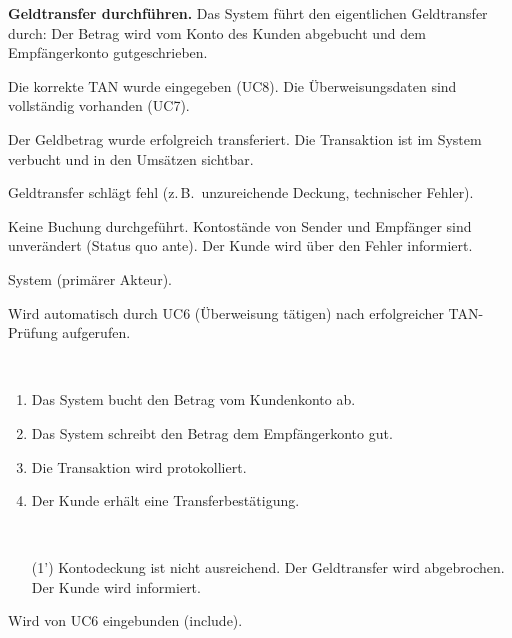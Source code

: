 \documentclass[12pt]{scrartcl}
\newcommand{\umark}[1]{\guillemotleft #1\guillemotright}
\begin{document}
    \begin{description}[leftmargin=4.5cm, style=nextline, font=\normalfont\bfseries]
  \item[Name und Kurzbeschreibung:]
  \textbf{Geldtransfer durchf\"uhren.}
  Das System f\"uhrt den eigentlichen Geldtransfer durch: Der Betrag wird vom
  Konto des Kunden abgebucht und dem Empf\"angerkonto gutgeschrieben.

  \item[Vorbedingung:]
  Die korrekte TAN wurde eingegeben (UC8). Die \"Uberweisungsdaten sind
  vollst\"andig vorhanden (UC7).

  \item[Nachbedingung:]
  Der Geldbetrag wurde erfolgreich transferiert. Die Transaktion ist im
  System verbucht und in den Ums\"atzen sichtbar.

  \item[Fehlersituationen:]
  Geldtransfer schl\"agt fehl (z.\,B.\ unzureichende Deckung, technischer Fehler).

  \item[Systemzustand im Fehlerfall:]
  Keine Buchung durchgef\"uhrt. Kontost\"ande von Sender und Empf\"anger sind
  unver\"andert (Status quo ante). Der Kunde wird \"uber den Fehler informiert.

  \item[Akteure:]
  System (prim\"arer Akteur).

  \item[Trigger:]
  Wird automatisch durch UC6 (\"Uberweisung t\"atigen) nach erfolgreicher
  TAN-Pr\"ufung aufgerufen.

  \item[Standardablauf:]~
  \begin{enumerate}
      \item Das System bucht den Betrag vom Kundenkonto ab.
      \item Das System schreibt den Betrag dem Empf\"angerkonto gut.
      \item Die Transaktion wird protokolliert.
      \item Der Kunde erh\"alt eine Transferbest\"atigung.
  \end{enumerate}

  \item[Alternativablauf:]~
  \begin{itemize}
      \item[(1')] Kontodeckung ist nicht ausreichend. Der Geldtransfer wird
      abgebrochen. Der Kunde wird informiert.
  \end{itemize}

  \item[Beziehung:]
  Wird von UC6 eingebunden (\umark{include}).
    \end{description}
\end{document}
